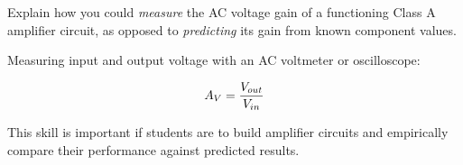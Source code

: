 

Explain how you could {\it measure} the AC voltage gain of a functioning Class A amplifier circuit, as opposed to {\it predicting} its gain from known component values.







Measuring input and output voltage with an AC voltmeter or oscilloscope:

$$A_V = {V_{out} \over V_{in}}$$







This skill is important if students are to build amplifier circuits and empirically compare their performance against predicted results.




